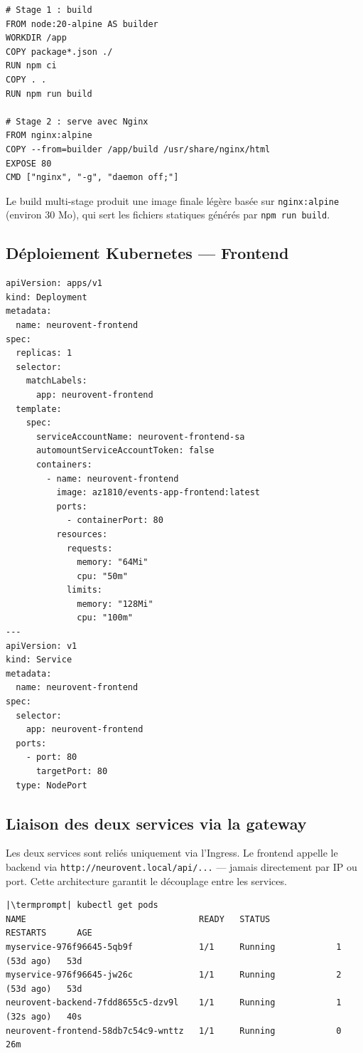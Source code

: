 \documentclass[12pt,a4paper]{article}
\makeatletter
\newcommand{\termprompt}{%
  \textcolor{termgreen}{\textbf{azouaou@Az-zou}}%
  \textcolor{termfg}{:}%
  \textcolor{termcyan}{\textasciitilde/NeuroVent}%
  \textcolor{termfg}{\$}}
\makeatother
\begin{document}
\begin{lstlisting}[style=terminal, caption={frontend-react/Dockerfile (multi-stage)}]
# Stage 1 : build
FROM node:20-alpine AS builder
WORKDIR /app
COPY package*.json ./
RUN npm ci
COPY . .
RUN npm run build

# Stage 2 : serve avec Nginx
FROM nginx:alpine
COPY --from=builder /app/build /usr/share/nginx/html
EXPOSE 80
CMD ["nginx", "-g", "daemon off;"]
\end{lstlisting}

Le build multi-stage produit une image finale légère basée sur \texttt{nginx:alpine}
(environ 30 Mo), qui sert les fichiers statiques générés par \texttt{npm run build}.

\subsection{Déploiement Kubernetes — Frontend}

\begin{lstlisting}[style=yaml, caption={k8s/frontend-deployment.yaml}]
apiVersion: apps/v1
kind: Deployment
metadata:
  name: neurovent-frontend
spec:
  replicas: 1
  selector:
    matchLabels:
      app: neurovent-frontend
  template:
    spec:
      serviceAccountName: neurovent-frontend-sa
      automountServiceAccountToken: false
      containers:
        - name: neurovent-frontend
          image: az1810/events-app-frontend:latest
          ports:
            - containerPort: 80
          resources:
            requests:
              memory: "64Mi"
              cpu: "50m"
            limits:
              memory: "128Mi"
              cpu: "100m"
---
apiVersion: v1
kind: Service
metadata:
  name: neurovent-frontend
spec:
  selector:
    app: neurovent-frontend
  ports:
    - port: 80
      targetPort: 80
  type: NodePort
\end{lstlisting}

\subsection{Liaison des deux services via la gateway}

Les deux services sont reliés uniquement via l'Ingress. Le frontend appelle le backend
via \texttt{http://neurovent.local/api/...} — jamais directement par IP ou port.
Cette architecture garantit le découplage entre les services.

\begin{lstlisting}[style=terminal, caption={État du cluster après l'étape 3}]
|\termprompt| kubectl get pods
NAME                                  READY   STATUS             RESTARTS      AGE
myservice-976f96645-5qb9f             1/1     Running            1 (53d ago)   53d
myservice-976f96645-jw26c             1/1     Running            2 (53d ago)   53d
neurovent-backend-7fdd8655c5-dzv9l    1/1     Running            1 (32s ago)   40s
neurovent-frontend-58db7c54c9-wnttz   1/1     Running            0             26m
\end{lstlisting}
\end{document}
